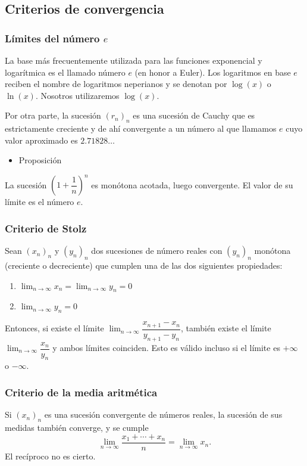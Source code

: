 \documentclass[12pt]{article}
\begin{document}
\subsection{Criterios de convergencia}
\subsubsection{Límites del número $e$}
La base más frecuentemente utilizada para las funciones exponencial y logarítmica es el llamado número $e$ (en honor a Euler). Los logaritmos en base $e$ reciben el nombre de logaritmos neperianos y se denotan por $\log(x)$ o $\ln(x)$. Nosotros utilizaremos $\log(x)$.

Por otra parte, la sucesión $ (r_n)_n $ es una sucesión de Cauchy que es estrictamente creciente y de ahí convergente a un número al que llamamos $e$ cuyo valor aproximado es $2.71828\hdots$

\begin{itemize}[label=\color{red}\textbullet, leftmargin=*]
	\item \color{lightblue} Proposición
\end{itemize}
La sucesión $\left(1+\dfrac{1}{n}\right)^n$ es monótona acotada, luego convergente. El valor de su límite es el número $e$.
\subsubsection{Criterio de Stolz}
Sean $(x_n)_n $ y $(y_n)_n $ dos sucesiones de número reales con $(y_n)_n $ monótona (creciente o decreciente) que cumplen una de las dos siguientes propiedades:
\begin{enumerate}[label=\arabic*)]
	\item $\lim_{n\to\infty}x_n=\lim_{n\to\infty}y_n=0$
	\item $\lim_{n\to\infty}y_n=0$
\end{enumerate}
Entonces, si existe el límite $\lim_{n\to\infty}\dfrac{x_{n+1}-x_n}{y_{n+1}-y_n}$, también existe el límite $\lim_{n\to\infty}\dfrac{x_n}{y_n}$ y ambos límites coinciden. Esto es válido incluso si el límite es $+\infty$ o $-\infty$.
\subsubsection{Criterio de la media aritmética}
Si $(x_n)_n $ es una sucesión convergente de números reales, la sucesión de sus medidas también converge, y se cumple \[ \lim_{n\to\infty}\dfrac{x_1+\cdots+x_n}{n}=\lim_{n\to\infty}x_n. \]
El recíproco no es cierto.
\end{document}
